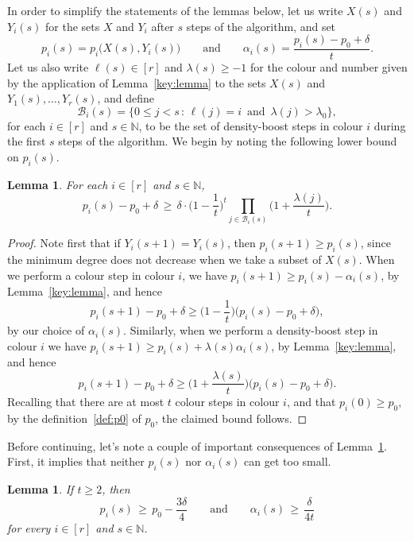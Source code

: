 \documentclass[12pt,reqno]{amsart}
\newtheorem{lemma}[theorem]{Lemma}
\theoremstyle{definition}
\theoremstyle{remark}
\newcommand\N{\mathbb{N}}
\newcommand\cB{\mathcal{B}}
\renewcommand{\le}{\leqslant}
\renewcommand{\ge}{\geqslant}
\def\N{\mathbb{N}}
\def\cB{\mathcal{B}}
\begin{document}
In order to simplify the statements of the lemmas below, let us write $X(s)$ and $Y_i(s)$ for the sets $X$ and $Y_i$ after $s$ steps of the algorithm, and set 
$$p_i(s) = p_i\big( X(s), Y_i(s) \big) \qquad \text{and} \qquad \alpha_i(s) = \frac{p_i(s) - p_0 + \delta}{t}.$$ 
Let us also write $\ell(s) \in [r]$ and $\lambda(s) \ge -1$ for the colour and number given by the application of Lemma~\ref{key:lemma} to the sets $X(s)$ and $Y_1(s),\dots,Y_r(s)$, and define
$$\cB_i(s) = \big\{ 0 \le j < s \,:\, \ell(j) = i \, \text{ and } \, \lambda(j) > \lambda_0 \big\},$$
for each $i \in [r]$ and $s \in \N$, to be the set of density-boost steps in colour $i$ during the first $s$ steps of the algorithm. We begin by noting the following lower bound on $p_i(s)$. 

\begin{lemma}\label{lem:pi:lower:bound}
For each $i \in [r]$ and $s \in \N$, 
\begin{equation}\label{eq:pi:lower:bound}
p_i(s) - p_0 + \delta \, \ge \, \delta \cdot \bigg( 1 - \frac{1}{t} \bigg)^{t} \prod_{j \in \cB_i(s)} \bigg( 1 + \frac{\lambda(j)}{t} \bigg).
\end{equation}
\end{lemma}

\begin{proof}
Note first that if $Y_i(s+1) = Y_i(s)$, then $p_i(s+1) \ge p_i(s)$, since the minimum degree does not decrease when we take a subset of $X(s)$. When we perform a colour step in colour $i$, %
we have $p_i(s+1) \ge p_i(s) - \alpha_i(s)$, by Lemma~\ref{key:lemma}, and hence
$$p_i(s+1) - p_0 + \delta \ge \bigg( 1 - \frac{1}{t} \bigg) \big( p_i(s) - p_0 + \delta \big),$$
by our choice of $\alpha_i(s)$. Similarly, when we perform a density-boost step in colour $i$  
we have $p_i(s+1) \ge p_i(s) + \lambda(s) \alpha_i(s)$, by Lemma~\ref{key:lemma}, and hence
$$p_i(s+1) - p_0 + \delta \ge \bigg( 1 + \frac{\lambda(s)}{t} \bigg) \big( p_i(s) - p_0 + \delta \big).$$
Recalling that there are at most $t$ colour steps in colour $i$, and that $p_i(0) \ge p_0$, by the definition~\eqref{def:p0} of $p_0$, the claimed bound follows. 
\end{proof}

Before continuing, let's note a couple of important consequences of Lemma~\ref{lem:pi:lower:bound}. First, it implies that neither $p_i(s)$ nor $\alpha_i(s)$ can get too small. 

\begin{lemma}\label{lem:pi:min}
If\/ $t \ge 2$, then 
$$p_i(s) \, \ge \, p_0 - \frac{3\delta}{4} \qquad \text{and} \qquad \alpha_i(s) \, \ge \, \frac{\delta}{4t}$$
for every $i \in [r]$ and $s \in \N$. 
\end{lemma}
\end{document}
